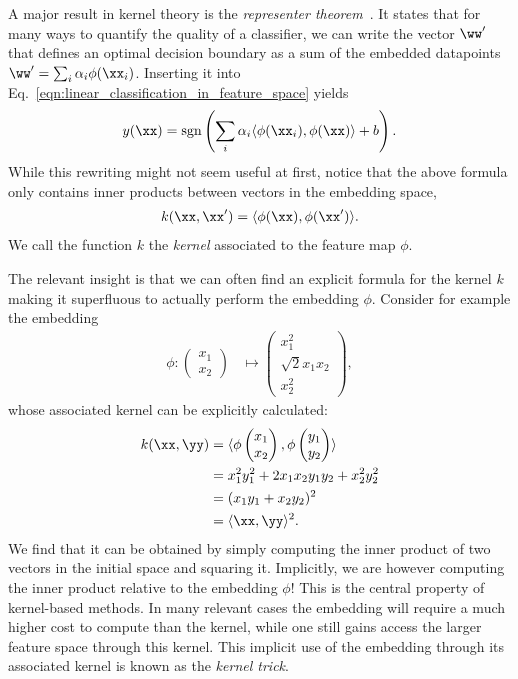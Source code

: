 \documentclass[twocolumn,superscriptaddress,nofootinbib]{revtex4-2}
\begin{document}
A major result in kernel theory is the \emph{representer theorem}~\cite{scholkopf2002learning}. It states that for many ways to quantify the quality of a classifier, we can write the vector $\ww'$ that defines an optimal decision boundary as a sum of the embedded datapoints $\ww' = \sum_i \alpha_i \phi(\xx_i)$. Inserting it into Eq.~\eqref{eqn:linear_classification_in_feature_space} yields
\begin{align}\label{eqn:linear_kernel_prediction}
    y(\xx) = \operatorname{sgn}\left(\sum_i \alpha_i \langle \phi(\xx_i), \phi(\xx)\rangle + b\right).
\end{align}
While this rewriting might not seem useful at first, notice that the above formula only contains inner products between vectors in the embedding space,
\begin{align}
    k(\xx, \xx') = \langle \phi(\xx), \phi(\xx')\rangle.
\end{align}
We call the function $k$ the \emph{kernel} associated to the feature map $\phi$.

The relevant insight is that we can often find an explicit formula for the kernel $k$ making it superfluous to actually perform the embedding $\phi$.
Consider for example the embedding
\begin{align}
    \phi\colon\begin{pmatrix}x_1 \\ x_2 \end{pmatrix} &\mapsto \begin{pmatrix} x_1^2 \\ \sqrt{2} x_1 x_2 \\ x_2^2 \end{pmatrix},
\end{align}
whose associated kernel can be explicitly calculated:
\begin{align}
k(\xx, \yy)
&= \langle \phi\begin{pmatrix}x_1 \\ x_2 \end{pmatrix}, \phi\begin{pmatrix}y_1 \\ y_2 \end{pmatrix}\rangle \\
&= x_1^2 y_1^2 + 2 x_1 x_2 y_1 y_2 + x_2^2 y_2^2 \\
&= (x_1 y_1 + x_2 y_2)^2 \\
&= \langle \xx, \yy \rangle^2.
\end{align}
We find that it can be obtained by simply computing the inner product of two vectors in the initial space and squaring it. Implicitly, we are however computing the inner product relative to the embedding $\phi$! 
This is the central property of kernel-based methods. In many relevant cases the embedding will require a much higher cost to compute than the kernel, while one still gains access the larger feature space through this kernel. This implicit use of the embedding through its associated kernel is known as the \emph{kernel trick}.
\end{document}
